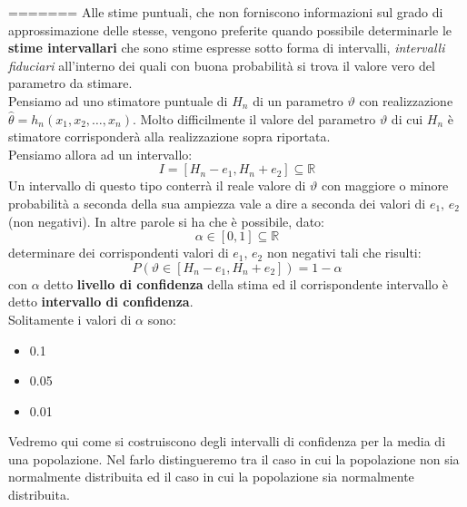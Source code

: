 \documentclass[a4paper,12pt, oneside]{book}
\newcommand{\numberset}{\mathbb}
\newcommand{\R}{\numberset{R}}
\begin{document}
=======
Alle stime puntuali, che non forniscono informazioni sul grado di approssimazione delle
stesse, vengono preferite quando possibile
determinarle le \textbf{stime intervallari} che sono stime espresse sotto forma di
intervalli, \textit{intervalli fiduciari} all’interno dei quali con buona probabilità si trova
il valore vero del parametro da stimare.\\
Pensiamo ad uno stimatore puntuale di $H_n$ di un parametro $\vartheta$ con realizzazione $\hat{\theta}=h_{n}\left(x_{1}, x_{2}, \ldots, x_{n}\right)$. Molto difficilmente il valore del parametro $\vartheta$ di cui $H_n$ è stimatore corrisponderà alla realizzazione sopra riportata.\\
Pensiamo allora ad un intervallo:
\[I=\left[H_{n}-e_{1}, H_{n}+e_{2}\right] \subseteq \R\]
Un intervallo di questo tipo conterrà il reale valore di $\vartheta$ con maggiore o minore
probabilità a seconda della sua ampiezza vale a dire a seconda dei valori di $e_1,\, e_2$ (non negativi). In altre parole si ha che è possibile, dato:
\[\alpha \in[0,1] \subseteq \R\]
determinare dei corrispondenti valori di $e_1,\,e_2$ non negativi tali che risulti:
\[P\left(\vartheta \in\left[H_{n}-e_{1}, H_{n}+e_{2}\right]\right)=1-\alpha\]
con $\alpha$ detto \textbf{livello di confidenza} della stima ed il corrispondente intervallo è detto \textbf{intervallo di confidenza}.\\
Solitamente i valori di $\alpha$ sono:
\begin{itemize}
\item 0.1
\item 0.05
\item 0.01  
\end{itemize}
Vedremo qui come si costruiscono degli intervalli di confidenza per la media di una
popolazione.
Nel farlo distingueremo tra il caso in cui la popolazione non sia normalmente
distribuita ed il caso in cui la popolazione sia normalmente distribuita.
\end{document}
